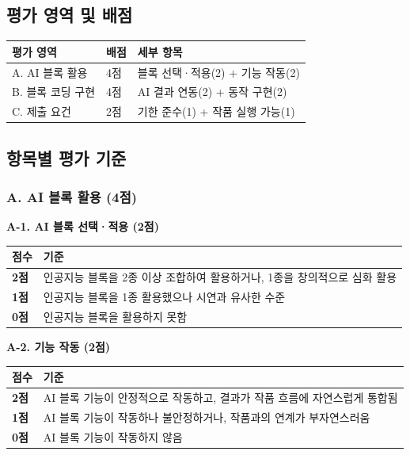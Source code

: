 \documentclass[a4paper,11pt]{ltjsarticle}
\begin{document}
\subsection{평가 영역 및 배점}

\noindent
\begin{tabularx}{\textwidth}{|X|>{\centering\arraybackslash}p{1.3cm}|X|}
\hline
\textbf{평가 영역} & \textbf{배점} & \textbf{세부 항목} \\ \hline
A. AI 블록 활용 & 4점 & 블록 선택·적용(2) + 기능 작동(2) \\ \hline
B. 블록 코딩 구현 & 4점 & AI 결과 연동(2) + 동작 구현(2) \\ \hline
C. 제출 요건 & 2점 & 기한 준수(1) + 작품 실행 가능(1) \\ \hline
\end{tabularx}

\subsection{항목별 평가 기준}

\subsubsection{A. AI 블록 활용 (4점)}

\textbf{A-1. AI 블록 선택·적용 (2점)}

\noindent
\begin{tabularx}{\textwidth}{|>{\centering\arraybackslash}p{1cm}|X|}
\hline
\textbf{점수} & \textbf{기준} \\ \hline
\textbf{2점} & 인공지능 블록을 2종 이상 조합하여 활용하거나, 1종을 창의적으로 심화 활용 \\ \hline
\textbf{1점} & 인공지능 블록을 1종 활용했으나 시연과 유사한 수준 \\ \hline
\textbf{0점} & 인공지능 블록을 활용하지 못함 \\ \hline
\end{tabularx}

\vspace{0.3em}
\textbf{A-2. 기능 작동 (2점)}

\noindent
\begin{tabularx}{\textwidth}{|>{\centering\arraybackslash}p{1cm}|X|}
\hline
\textbf{점수} & \textbf{기준} \\ \hline
\textbf{2점} & AI 블록 기능이 안정적으로 작동하고, 결과가 작품 흐름에 자연스럽게 통합됨 \\ \hline
\textbf{1점} & AI 블록 기능이 작동하나 불안정하거나, 작품과의 연계가 부자연스러움 \\ \hline
\textbf{0점} & AI 블록 기능이 작동하지 않음 \\ \hline
\end{tabularx}
\end{document}
